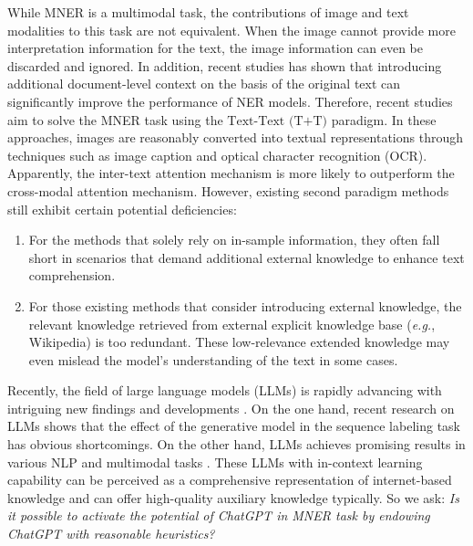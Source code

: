 \documentclass[11pt]{article}
\begin{document}
While MNER is a multimodal task, the contributions of image and text modalities to this task are not equivalent. 
When the image cannot provide more interpretation information for the text, the image information can even be discarded and ignored. 
In addition, recent studies \citep{wang2021improving,zhang2022domain} has shown that introducing additional document-level context on the basis of the original text can significantly improve the performance of NER models. Therefore, recent studies \citep{wang2021ita,wang2022named} aim to solve the MNER task using the $\text{Text-Text (T+T)}$ paradigm.
In these approaches, images are reasonably  converted into textual representations through techniques such as image caption and optical character recognition (OCR). Apparently, the inter-text attention mechanism is more likely to outperform the cross-modal attention mechanism. 
However, existing second paradigm methods still exhibit certain potential deficiencies:
\begin{enumerate}[label=(\roman*)]
    \vspace{-3pt}
    \item
    For the methods that solely rely on in-sample information, 
    they often fall short in scenarios that demand additional external knowledge to enhance text comprehension. 
    \vspace{-3pt}
    \item
    For those existing methods that consider introducing external knowledge, the relevant knowledge retrieved from external explicit knowledge base (\emph{e.g.}, Wikipedia) is too redundant. These low-relevance extended knowledge may even mislead the model's understanding of the text in some cases.
\end{enumerate}
\vspace{-3pt}

Recently, the field of large language models (LLMs) is rapidly advancing with intriguing new findings and developments \citep{brown2020language,touvron2023llama}. On the one hand, recent research on LLMs \citep{qin2023chatgpt,wei2023zero,wang2023gpt} shows that the effect of the generative model in the sequence labeling task has obvious shortcomings. On the other hand, LLMs achieves promising results in various NLP \citep{vilar2022prompting,moslem2023adaptive} and multimodal tasks \citep{yang2022empirical,shao2023prompting}. 
These LLMs with in-context learning capability can be perceived as a comprehensive representation of internet-based knowledge and can offer high-quality auxiliary knowledge typically.
So we ask: \emph{Is it possible to activate the potential of ChatGPT in MNER task by endowing ChatGPT with reasonable heuristics?} 
\end{document}
